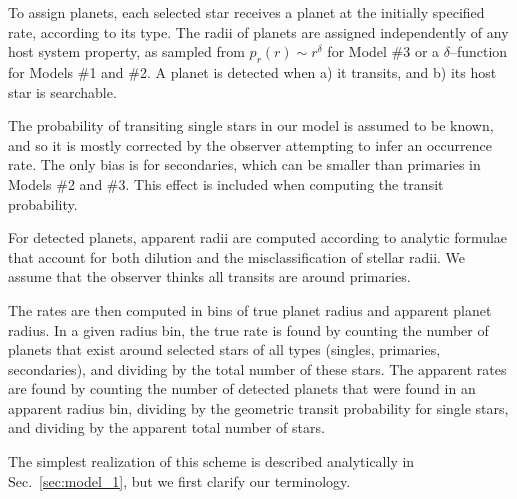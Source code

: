 To assign planets, each selected star receives a planet at the initially 
specified rate, according to its type.
The radii of planets are assigned independently of any host system
property, as sampled from $p_r(r) \sim r^\delta$ for Model \#3 or a 
$\delta$--function 
for Models \#1 and \#2.
A planet is detected when a) it transits, and b) its host star is
searchable.

The probability of transiting single stars in our model is assumed to be known,
and so it is mostly corrected by the observer attempting to infer an
occurrence rate. The only bias is for secondaries, which can be smaller than 
primaries in Models \#2 and \#3.
This effect is included when computing the transit probability.

For detected planets, apparent radii are computed according to analytic
formulae that account for both dilution and the misclassification of stellar
radii. We assume that the observer thinks all transits are around primaries.

The rates are then computed in bins of true planet radius and apparent planet
radius.
In a given radius bin, the true rate is found by counting the number of planets
that exist around selected stars of all types (singles, primaries,
secondaries), and dividing by the total number of these stars.
The apparent rates are found by counting the number of detected planets that
were found in an apparent radius bin, dividing by the geometric transit
probability for single stars, and dividing by the apparent total number of
stars.

The simplest realization of this scheme is described analytically in 
Sec.~\ref{sec:model_1}, but we first clarify our terminology.
